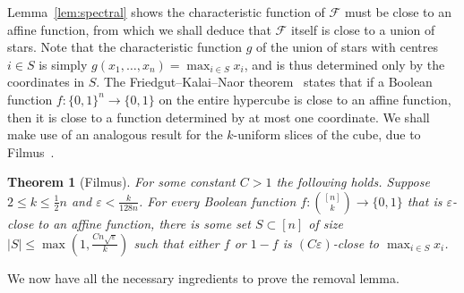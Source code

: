 \documentclass[11pt]{article}
\newtheorem{theorem}{Theorem}[section]
\theoremstyle{definition}
\newcommand{\eps}{\varepsilon}
\newcommand{\cF}{\mathcal{F}}
\newcommand{\3}{\bf{3}}
\newcommand{\card}[1]{\left| #1 \right|}
\begin{document}
Lemma~\ref{lem:spectral} shows the characteristic function of $\cF$ must be close to an affine function, from which we shall deduce that $\cF$ itself is close to a union of stars.  Note that the characteristic function $g$ of the union of stars with centres $i \in S$ is simply $g(x_1, \hdots, x_n) = \max_{i \in S} x_i$, and is thus determined only by the coordinates in $S$.  The Friedgut--Kalai--Naor theorem~\cite{fkn02} states that if a Boolean function $f: \{0,1\}^n \rightarrow \{0,1\}$ on the entire hypercube is close to an affine function, then it is close to a function determined by at most one coordinate.  We shall make use of an analogous result for the $k$-uniform slices of the cube, due to Filmus~\cite{fil14}.

\begin{theorem}[Filmus] \label{thm:filmus}
For some constant $C > 1$ the following holds.  Suppose $2 \le k \le \tfrac12 n$ and $\eps < \frac{k}{128n}$.  For every Boolean function $f: \binom{[n]}{k} \rightarrow \{0,1\}$ that is $\eps$-close to an affine function, there is some set $S \subset [n]$ of size $\card{S} \le \max \left( 1, \frac{Cn \sqrt{\eps}}{k} \right)$ such that either $f$ or $1-f$ is $(C \eps)$-close to $\max_{i \in S} x_i$.
\end{theorem}

We now have all the necessary ingredients to prove the removal lemma.
\end{document}

